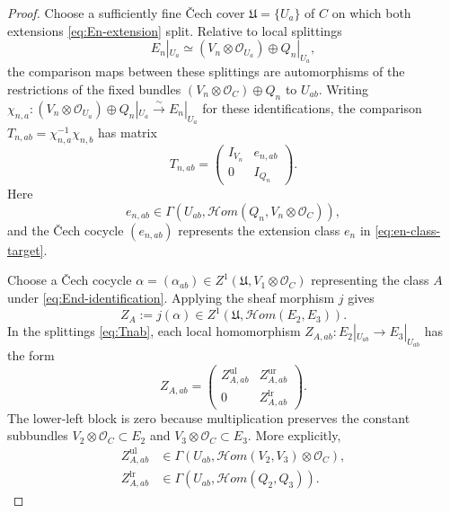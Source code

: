 \documentclass[10pt,a4paper]{amsart}
\newcommand{\cHom}{\mathcal{H}om}
\newcommand{\cO}{\mathcal O}
\begin{document}
\begin{proof}
Choose a sufficiently fine \v Cech cover
$\mathfrak U=\{U_a\}$ of $C$ on which both extensions
\eqref{eq:En-extension} split.  Relative to local splittings
$$
 E_n|_{U_a}\simeq
 (V_n\otimes\cO_{U_a})\oplus Q_n|_{U_a},
$$
the comparison maps between these splittings are automorphisms of
the restrictions of the fixed bundles
$(V_n\otimes\cO_C)\oplus Q_n$ to $U_{ab}$.
Writing $\chi_{n,a}:(V_n\otimes\cO_{U_a})\oplus Q_n|_{U_a}
\xrightarrow{\sim}E_n|_{U_a}$ for these identifications, the comparison
$T_{n,ab}=\chi_{n,a}^{-1}\chi_{n,b}$ has matrix
\begin{equation}\label{eq:Tnab}
 T_{n,ab}=
 \begin{pmatrix}I_{V_n}&e_{n,ab}\\0&I_{Q_n}\end{pmatrix}.
\end{equation}
Here
$$
 e_{n,ab}\in
 \Gamma\!\left(U_{ab},
 \cHom(Q_n,V_n\otimes\cO_C)\right),
$$
and the \v Cech cocycle $(e_{n,ab})$ represents the extension class
$e_n$ in \eqref{eq:en-class-target}.

Choose a \v Cech cocycle
$\alpha=(\alpha_{ab})\in
Z^1(\mathfrak U,V_1\otimes\cO_C)$ representing the class $A$ under
\eqref{eq:End-identification}.  Applying the sheaf morphism $j$ gives
$$
 Z_A:=j(\alpha)\in
 Z^1\!\left(\mathfrak U,\cHom(E_2,E_3)\right).
$$
In the splittings \eqref{eq:Tnab}, each local homomorphism
$Z_{A,ab}:E_2|_{U_{ab}}\to E_3|_{U_{ab}}$ has the form
\begin{equation}\label{eq:ZA-blocks}
 Z_{A,ab}=
 \begin{pmatrix}
  Z_{A,ab}^{\mathrm{ul}}&Z_{A,ab}^{\mathrm{ur}}\\
  0&Z_{A,ab}^{\mathrm{lr}}
 \end{pmatrix}.
\end{equation}
The lower-left block is zero because multiplication preserves the constant
subbundles $V_2\otimes\cO_C\subset E_2$ and
$V_3\otimes\cO_C\subset E_3$.  More explicitly,
$$
\begin{aligned}
 Z_{A,ab}^{\mathrm{ul}}
 &\in\Gamma\!\left(
 U_{ab},\cHom(V_2,V_3)\otimes\cO_C\right),\\
 Z_{A,ab}^{\mathrm{lr}}
 &\in\Gamma\!\left(U_{ab},\cHom(Q_2,Q_3)\right).
\end{aligned}
$$


\end{proof}
\end{document}

